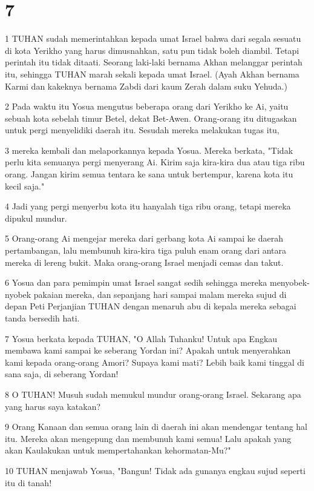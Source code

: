 \chapter{7}

\par 1 TUHAN sudah memerintahkan kepada umat Israel bahwa dari segala sesuatu di kota Yerikho yang harus dimusnahkan, satu pun tidak boleh diambil. Tetapi perintah itu tidak ditaati. Seorang laki-laki bernama Akhan melanggar perintah itu, sehingga TUHAN marah sekali kepada umat Israel. (Ayah Akhan bernama Karmi dan kakeknya bernama Zabdi dari kaum Zerah dalam suku Yehuda.)
\par 2 Pada waktu itu Yosua mengutus beberapa orang dari Yerikho ke Ai, yaitu sebuah kota sebelah timur Betel, dekat Bet-Awen. Orang-orang itu ditugaskan untuk pergi menyelidiki daerah itu. Sesudah mereka melakukan tugas itu,
\par 3 mereka kembali dan melaporkannya kepada Yosua. Mereka berkata, "Tidak perlu kita semuanya pergi menyerang Ai. Kirim saja kira-kira dua atau tiga ribu orang. Jangan kirim semua tentara ke sana untuk bertempur, karena kota itu kecil saja."
\par 4 Jadi yang pergi menyerbu kota itu hanyalah tiga ribu orang, tetapi mereka dipukul mundur.
\par 5 Orang-orang Ai mengejar mereka dari gerbang kota Ai sampai ke daerah pertambangan, lalu membunuh kira-kira tiga puluh enam orang dari antara mereka di lereng bukit. Maka orang-orang Israel menjadi cemas dan takut.
\par 6 Yosua dan para pemimpin umat Israel sangat sedih sehingga mereka menyobek-nyobek pakaian mereka, dan sepanjang hari sampai malam mereka sujud di depan Peti Perjanjian TUHAN dengan menaruh abu di kepala mereka sebagai tanda bersedih hati.
\par 7 Yosua berkata kepada TUHAN, "O Allah Tuhanku! Untuk apa Engkau membawa kami sampai ke seberang Yordan ini? Apakah untuk menyerahkan kami kepada orang-orang Amori? Supaya kami mati? Lebih baik kami tinggal di sana saja, di seberang Yordan!
\par 8 O TUHAN! Musuh sudah memukul mundur orang-orang Israel. Sekarang apa yang harus saya katakan?
\par 9 Orang Kanaan dan semua orang lain di daerah ini akan mendengar tentang hal itu. Mereka akan mengepung dan membunuh kami semua! Lalu apakah yang akan Kaulakukan untuk mempertahankan kehormatan-Mu?"
\par 10 TUHAN menjawab Yosua, "Bangun! Tidak ada gunanya engkau sujud seperti itu di tanah!
